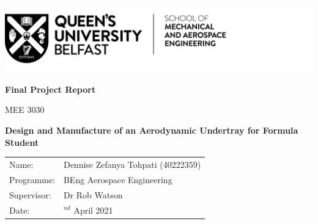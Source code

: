 \begin{titlepage}
\includegraphics[scale=1]{Figures/QUB LOGO - SMAE.png}
\centering

\vspace{4cm}
\textbf{Final Project Report}

MEE 3030

\vspace{2cm}
\textbf{\large{Design and Manufacture of an Aerodynamic Undertray for Formula Student}}


\vspace{8cm}
\begin{tabularx}{1\textwidth}{ 
   >{\raggedleft\arraybackslash}X 
   >{\raggedright\arraybackslash}X 
  }
  
Name: & \quad Dennise Zefanya Tohpati (40222359)\\
Programme: & \quad BEng Aerospace Engineering\\
Supervisor: & \quad Dr Rob Watson\\
Date: & \quad 2$^{nd}$ April 2021\\

\end{tabularx}
\end{titlepage}


